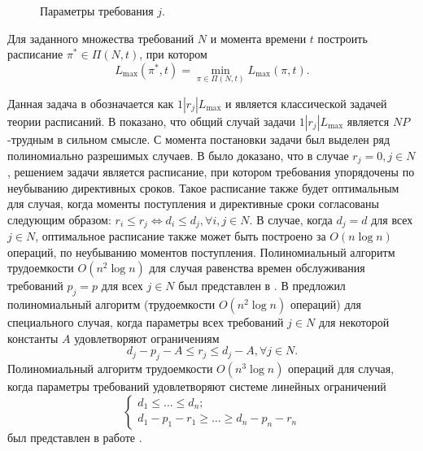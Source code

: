 \begin{figure}[h!]
\caption{Параметры требования $j$.}
\label{Lmax_ab:ris:1}
\end{figure}

\begin{problem}\label{Lmax_ab:pr:1}
Для заданного множества требований $N$ и момента времени $t$ построить расписание $\pi^* \in \Pi(N,t)$, при котором
\begin{equation*}\label{Lmax_ab:GF}
    L_{\max}(\pi^*,t) = \min\limits_{\pi \in \Pi(N,t)}L_{\max}(\pi,t).
\end{equation*}
\end{problem}

Данная задача в \cite{GLLR:79} обозначается как $1|r_j|L_{\max}$ и является классической задачей теории расписаний. В \cite{LRB:77} показано, что общий случай задачи $1|r_j|L_{\max}$ является $NP$-трудным в сильном смысле. С момента постановки задачи был выделен ряд полиномиально разрешимых случаев. В \cite{Jack:55} было доказано, что в случае $r_j = 0, j \in N$, решением задачи является расписание, при котором требования упорядочены по неубыванию директивных сроков. Такое расписание также будет оптимальным для случая, когда моменты поступления и директивные сроки согласованы следующим образом: $r_i \leq r_j \Leftrightarrow d_i \leq d_j, \forall i,j \in N$. В случае, когда $d_j = d$ для всех $j \in N$, оптимальное расписание также может быть построено за $O(n \log n)$ операций, по неубыванию моментов поступления. Полиномиальный алгоритм трудоемкости $O(n^2 \log n)$ для случая равенства времен обслуживания требований $p_j = p$ для всех $j \in N$ был представлен в \cite{Sim:78}. В \cite{Hog:96} предложил полиномиальный алгоритм (трудоемкости $O(n^2 \log n)$ операций) для специального случая, когда параметры всех требований $j \in N$ для некоторой константы $A$ удовлетворяют ограничениям
$$d_j - p_j - A \leq r_j \leq d_j - A, \forall j \in N.$$
Полиномиальный алгоритм трудоемкости $O(n^3 \log n)$ операций для случая, когда параметры требований удовлетворяют системе линейных ограничений
\begin{equation*}
\begin{cases}
    d_1 \leq \dots \leq d_n;\\
    d_1 - p_1 - r_1 \geq \dots \geq d_n -  p_n - r_n
\end{cases}
\end{equation*}
был представлен в работе \cite{Laz:08}.

